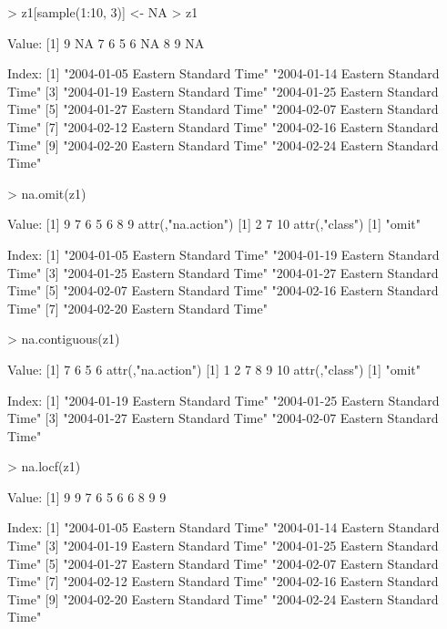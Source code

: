 \documentclass{Z}
\begin{document}
\begin{Schunk}
\begin{Sinput}
> z1[sample(1:10, 3)] <- NA
> z1
\end{Sinput}
\begin{Soutput}
Value:
 [1]  9 NA  7  6  5  6 NA  8  9 NA

Index:
 [1] "2004-01-05 Eastern Standard Time" "2004-01-14 Eastern Standard Time"
 [3] "2004-01-19 Eastern Standard Time" "2004-01-25 Eastern Standard Time"
 [5] "2004-01-27 Eastern Standard Time" "2004-02-07 Eastern Standard Time"
 [7] "2004-02-12 Eastern Standard Time" "2004-02-16 Eastern Standard Time"
 [9] "2004-02-20 Eastern Standard Time" "2004-02-24 Eastern Standard Time"
\end{Soutput}
\begin{Sinput}
> na.omit(z1)
\end{Sinput}
\begin{Soutput}
Value:
[1] 9 7 6 5 6 8 9
attr(,"na.action")
[1]  2  7 10
attr(,"class")
[1] "omit"

Index:
[1] "2004-01-05 Eastern Standard Time" "2004-01-19 Eastern Standard Time"
[3] "2004-01-25 Eastern Standard Time" "2004-01-27 Eastern Standard Time"
[5] "2004-02-07 Eastern Standard Time" "2004-02-16 Eastern Standard Time"
[7] "2004-02-20 Eastern Standard Time"
\end{Soutput}
\begin{Sinput}
> na.contiguous(z1)
\end{Sinput}
\begin{Soutput}
Value:
[1] 7 6 5 6
attr(,"na.action")
[1]  1  2  7  8  9 10
attr(,"class")
[1] "omit"

Index:
[1] "2004-01-19 Eastern Standard Time" "2004-01-25 Eastern Standard Time"
[3] "2004-01-27 Eastern Standard Time" "2004-02-07 Eastern Standard Time"
\end{Soutput}
\begin{Sinput}
> na.locf(z1)
\end{Sinput}
\begin{Soutput}
Value:
 [1] 9 9 7 6 5 6 6 8 9 9

Index:
 [1] "2004-01-05 Eastern Standard Time" "2004-01-14 Eastern Standard Time"
 [3] "2004-01-19 Eastern Standard Time" "2004-01-25 Eastern Standard Time"
 [5] "2004-01-27 Eastern Standard Time" "2004-02-07 Eastern Standard Time"
 [7] "2004-02-12 Eastern Standard Time" "2004-02-16 Eastern Standard Time"
 [9] "2004-02-20 Eastern Standard Time" "2004-02-24 Eastern Standard Time"
\end{Soutput}
\end{Schunk}
\end{document}
